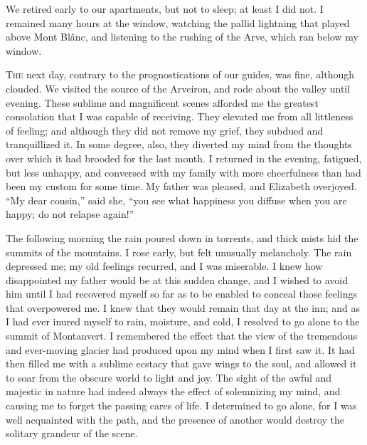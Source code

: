We retired early to our apartments,
but not to sleep; at least I did not.
I remained many hours at the window,
watching the pallid lightning that played
above Mont Blânc, and listening to
the rushing of the Arve, which ran
below my window.


\textsc{The} next day, contrary to the prognostications
of our guides, was fine, although
clouded. We visited the source
of the Arveiron, and rode about the
valley until evening. These sublime
and magnificent scenes afforded me the
greatest consolation that I was capable
of receiving. They elevated me from
all littleness of feeling; and although
they did not remove my grief, they
subdued and tranquillized it. In some
degree, also, they diverted my mind
from the thoughts over which it had
brooded for the last month. I returned
in the evening, fatigued, but less unhappy,
and conversed with my family
with more cheerfulness than had been
my custom for some time. My father
was pleased, and Elizabeth overjoyed.
``My dear cousin,'' said she, ``you see
what happiness you diffuse when you
are happy; do not relapse again!''

The following morning the rain
poured down in torrents, and thick
mists hid the summits of the mountains.
I rose early, but felt unusually
melancholy. The rain depressed me;
my old feelings recurred, and I was
miserable. I knew how disappointed
my father would be at this sudden
change, and I wished to avoid him until
I had recovered myself so far as to
be enabled to conceal those feelings
that overpowered me. I knew that
they would remain that day at the inn;
and as I had ever inured myself to
rain, moisture, and cold, I resolved to
go alone to the summit of Montanvert.
I remembered the effect that the view
of the tremendous and ever-moving
glacier had produced upon my mind
when I first saw it. It had then filled
me with a sublime ecstacy that gave
wings to the soul, and allowed it to
soar from the obscure world to light
and joy. The sight of the awful and
majestic in nature had indeed always
the effect of solemnizing my mind, and
causing me to forget the passing cares
of life. I determined to go alone, for I
was well acquainted with the path, and
the presence of another would destroy
the solitary grandeur of the scene.

